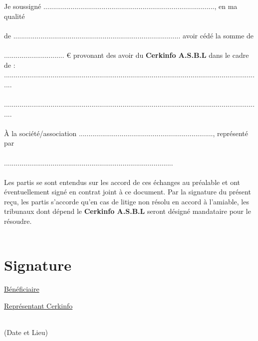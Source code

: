 \documentclass{article}
\begin{document}
\large{Je soussigné ........................................................................................, en ma qualité \\\\ de ...................................................................................... avoir cédé la somme de \\\\ ............................... € provonant des avoir du \textbf{Cerkinfo A.S.B.L} dans le cadre de : \\
.....................................................................................................................................\\\\
.....................................................................................................................................
\\\\
À la société/association ....................................................................., représenté par \\\\
....................................................................................... \\\\
Les partis se sont entendus sur les accord de ces échanges au préalable et ont éventuellement signé en contrat joint à ce document. Par la signature du présent reçu, les partis s'accorde qu'en cas de litige non résolu en accord à l'amiable, les tribunaux dont dépend le \textbf{Cerkinfo A.S.B.L} seront désigné mandataire pour le résoudre. 
}
\\\\
\begin{minipage}{0.4\textwidth}
\section*{Signature}
\end{minipage}
\begin{minipage}{0.4\textwidth}
\underline{Bénéficiaire}
\end{minipage}
\begin{minipage}{0.4\textwidth}
\underline{Représentant Cerkinfo}
\end{minipage}
\\
(Date et Lieu)
\end{document}
